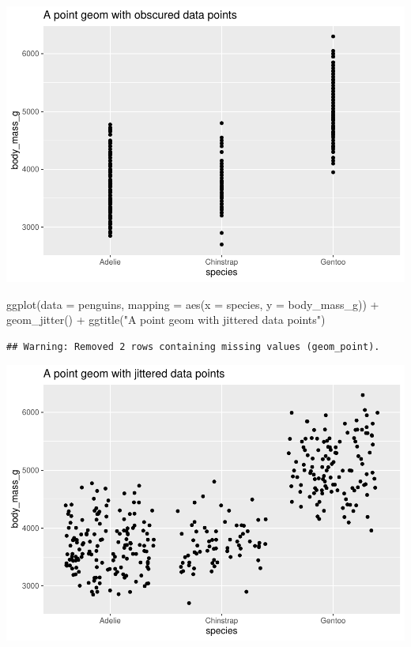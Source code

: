 \documentclass[
]{article}
\newenvironment{Shaded}{\begin{snugshade}}{\end{snugshade}}
\newcommand{\AttributeTok}[1]{\textcolor[rgb]{0.77,0.63,0.00}{#1}}
\newcommand{\FunctionTok}[1]{\textcolor[rgb]{0.00,0.00,0.00}{#1}}
\newcommand{\NormalTok}[1]{#1}
\newcommand{\SpecialCharTok}[1]{\textcolor[rgb]{0.00,0.00,0.00}{#1}}
\newcommand{\StringTok}[1]{\textcolor[rgb]{0.31,0.60,0.02}{#1}}
\begin{document}
\includegraphics{Grammar-of-Graphics_files/figure-latex/position-1.pdf}

\begin{Shaded}
\begin{Highlighting}[]
\FunctionTok{ggplot}\NormalTok{(}\AttributeTok{data =}\NormalTok{ penguins, }\AttributeTok{mapping =} \FunctionTok{aes}\NormalTok{(}\AttributeTok{x =}\NormalTok{ species, }\AttributeTok{y =}\NormalTok{ body\_mass\_g)) }\SpecialCharTok{+}
  \FunctionTok{geom\_jitter}\NormalTok{() }\SpecialCharTok{+}
  \FunctionTok{ggtitle}\NormalTok{(}\StringTok{"A point geom with jittered data points"}\NormalTok{)}
\end{Highlighting}
\end{Shaded}

\begin{verbatim}
## Warning: Removed 2 rows containing missing values (geom_point).
\end{verbatim}

\includegraphics{Grammar-of-Graphics_files/figure-latex/position-2.pdf}
\end{document}
